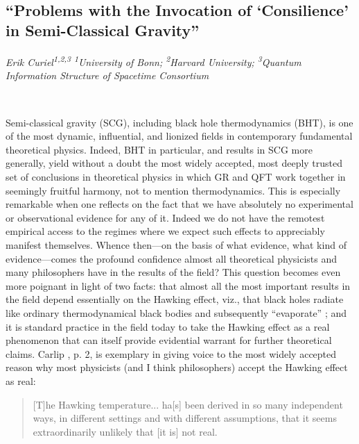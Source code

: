 \documentclass[11pt]{article}
\begin{document}
\ 

\newrefsection
\subsection*{\textsf{``Problems with the Invocation of
‘Consilience’ in Semi-Classical
Gravity''}}

\textcolor{moderncvgreen}{
\textit{Erik Curiel\textsuperscript{1,2,3} %
\newline
\textsuperscript{1}University of Bonn; \textsuperscript{2}Harvard University; \textsuperscript{3}Quantum Information Structure of Spacetime Consortium
}
}

\ 

Semi-classical gravity (SCG), including black hole thermodynamics (BHT), is one of the most dynamic, influential, and lionized fields in contemporary fundamental theoretical physics. Indeed, BHT in particular, and results in SCG more generally, yield without a doubt the most widely accepted, most deeply trusted set of conclusions in theoretical physics in which GR and QFT work together in seemingly fruitful harmony, not to mention thermodynamics. This is especially remarkable when one reflects on the fact that we have absolutely no experimental or observational evidence for any of it. Indeed we do not have the remotest empirical access to the regimes where we expect such effects to appreciably manifest themselves. Whence then—on the basis of what evidence, what kind of evidence—comes the profound confidence almost all theoretical physicists and many philosophers have in the results of the field? This question becomes even more poignant in light of two facts: that almost all the most important results in the field depend essentially on the Hawking effect, viz., that black holes radiate like ordinary thermodynamical black bodies and subsequently “evaporate” \cite{Wald2001, Carlip2014}; and it is standard practice in the field today to take the Hawking effect as a real phenomenon that can itself provide evidential warrant for further theoretical claims. Carlip \cite{Carlip2014}, p. 2, is exemplary in giving voice to the most widely accepted reason why most physicists (and I think philosophers) accept the Hawking effect as real:
\begin{quote}
[T]he Hawking temperature... ha[s] been derived in so many independent ways, in different settings and with different assumptions, that it seems extraordinarily unlikely that [it is] not real.
\end{quote}
\end{document}
